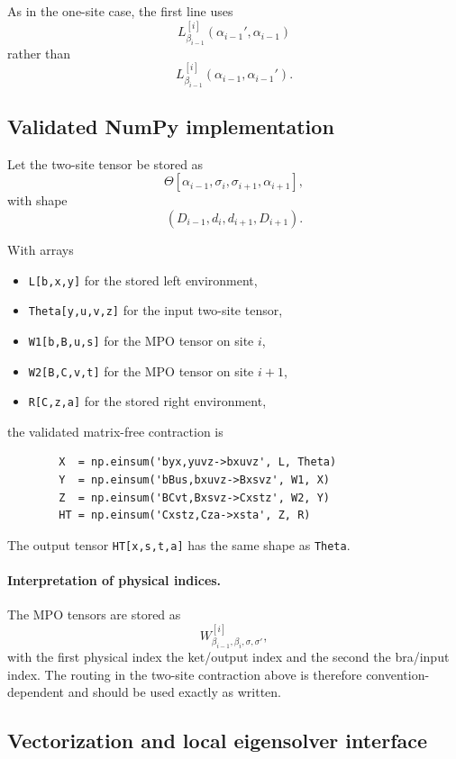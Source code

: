 \documentclass[aps,prb,onecolumn,nofootinbib]{revtex4-2}
\begin{document}
	As in the one-site case, the first line uses
	\[
	L^{[i]}_{\beta_{i-1}}(\alpha_{i-1}',\alpha_{i-1})
	\]
	rather than
	\[
	L^{[i]}_{\beta_{i-1}}(\alpha_{i-1},\alpha_{i-1}').
	\]
	
	\subsection{Validated NumPy implementation}
	
	Let the two-site tensor be stored as
	\[
	\Theta[\alpha_{i-1},\sigma_i,\sigma_{i+1},\alpha_{i+1}],
	\]
	with shape
	\[
	(D_{i-1},d_i,d_{i+1},D_{i+1}).
	\]
	
	With arrays
	\begin{itemize}
		\item \texttt{L[b,x,y]} for the stored left environment,
		\item \texttt{Theta[y,u,v,z]} for the input two-site tensor,
		\item \texttt{W1[b,B,u,s]} for the MPO tensor on site $i$,
		\item \texttt{W2[B,C,v,t]} for the MPO tensor on site $i+1$,
		\item \texttt{R[C,z,a]} for the stored right environment,
	\end{itemize}
	the validated matrix-free contraction is
	\begin{verbatim}
		X  = np.einsum('byx,yuvz->bxuvz', L, Theta)
		Y  = np.einsum('bBus,bxuvz->Bxsvz', W1, X)
		Z  = np.einsum('BCvt,Bxsvz->Cxstz', W2, Y)
		HT = np.einsum('Cxstz,Cza->xsta', Z, R)
	\end{verbatim}
	
	The output tensor \texttt{HT[x,s,t,a]} has the same shape as \texttt{Theta}.
	
	\paragraph{Interpretation of physical indices.}
	The MPO tensors are stored as
	\[
	W^{[i]}_{\beta_{i-1},\beta_i,\sigma,\sigma'},
	\]
	with the first physical index the ket/output index and the second the bra/input index.
	The routing in the two-site contraction above is therefore convention-dependent and should
	be used exactly as written.
	
	\subsection{Vectorization and local eigensolver interface}
	
\end{document}
